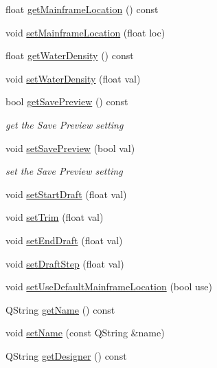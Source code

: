\begin{DoxyCompactItemize}
float \hyperlink{classShipCAD_1_1ProjectSettings_a194fe12f81ed80e691e8a89c88d91a0b}{get\-Mainframe\-Location} () const 
\item 
void \hyperlink{classShipCAD_1_1ProjectSettings_acac72dbc1dc2f68c1d32981ac9a27603}{set\-Mainframe\-Location} (float loc)
\item 
float \hyperlink{classShipCAD_1_1ProjectSettings_ad6289f32228b3a33c2c30db45339c438}{get\-Water\-Density} () const 
\item 
void \hyperlink{classShipCAD_1_1ProjectSettings_af4de74cc452581cf8f7e02431ba3e45a}{set\-Water\-Density} (float val)
\item 
bool \hyperlink{classShipCAD_1_1ProjectSettings_a2d836d4c61b9abf5b169858be9d4cd28}{get\-Save\-Preview} () const 
\begin{DoxyCompactList}\small\item\em get the Save Preview setting \end{DoxyCompactList}\item 
void \hyperlink{classShipCAD_1_1ProjectSettings_a3590a9b52236a4aeb9991ea03c518871}{set\-Save\-Preview} (bool val)
\begin{DoxyCompactList}\small\item\em set the Save Preview setting \end{DoxyCompactList}\item 
void \hyperlink{classShipCAD_1_1ProjectSettings_a9e389573e2266b099f49452d68edf24f}{set\-Start\-Draft} (float val)
\item 
void \hyperlink{classShipCAD_1_1ProjectSettings_afdab155f3ca324b3c200a97c9ade1ff6}{set\-Trim} (float val)
\item 
void \hyperlink{classShipCAD_1_1ProjectSettings_a45e70a08ac47cdf30971a7386af702a9}{set\-End\-Draft} (float val)
\item 
void \hyperlink{classShipCAD_1_1ProjectSettings_a45081194c5e105780429b0f214bab186}{set\-Draft\-Step} (float val)
\item 
void \hyperlink{classShipCAD_1_1ProjectSettings_a7c0f0e54fb2fb94a70b823fca6a6a58d}{set\-Use\-Default\-Mainframe\-Location} (bool use)
\item 
Q\-String \hyperlink{classShipCAD_1_1ProjectSettings_adeadfbedd4733c4c242dafbe55935397}{get\-Name} () const 
\item 
void \hyperlink{classShipCAD_1_1ProjectSettings_acaa6149ff4c93c829a72a3a3d2ff5239}{set\-Name} (const Q\-String \&name)
\item 
Q\-String \hyperlink{classShipCAD_1_1ProjectSettings_a03844b7fff96e8ade21a0dc5ff72a1b6}{get\-Designer} () const 

\end{DoxyCompactItemize}

